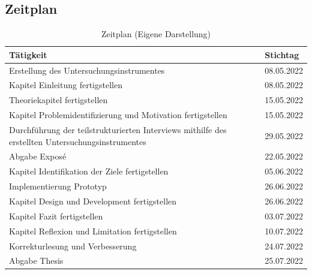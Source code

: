 \documentclass[12pt, oneside]{article}
\begin{document}
\subsection*{Zeitplan}

\begin{table}[ht]
    \begin{tabular}{@{}p{13cm}p{2cm}@{}}
        \toprule
        \textbf{Tätigkeit}                                                                               & \textbf{Stichtag} \\ \midrule
        Erstellung des Untersuchungsinstrumentes                                                         & 08.05.2022        \\ \midrule
        Kapitel Einleitung fertigstellen                                                                 & 08.05.2022        \\ \midrule
        Theoriekapitel fertigstellen                                                                     & 15.05.2022        \\ \midrule
        Kapitel Problemidentifizierung und Motivation fertigstellen                                      & 15.05.2022        \\ \midrule
        Durchführung der teilstrukturierten Interviews mithilfe des erstellten Untersuchungsinstrumentes & 29.05.2022        \\ \midrule
        Abgabe Exposé                                                                                    & 22.05.2022        \\ \midrule
        Kapitel Identifikation der Ziele fertigstellen                                                   & 05.06.2022        \\ \midrule
        Implementierung Prototyp                                                                         & 26.06.2022        \\ \midrule
        Kapitel Design und Development fertigstellen                                                     & 26.06.2022        \\ \midrule
        Kapitel Fazit fertigstellen                                                                      & 03.07.2022        \\ \midrule
        Kapitel Reflexion und Limitation fertigstellen                                                   & 10.07.2022        \\ \midrule
        Korrekturlesung und Verbesserung                                                                 & 24.07.2022        \\ \midrule
        Abgabe Thesis                                                                                    & 25.07.2022        \\ \bottomrule
    \end{tabular}
    \caption{\label{tab:time-table}Zeitplan (Eigene Darstellung)}
\end{table}
\end{document}

